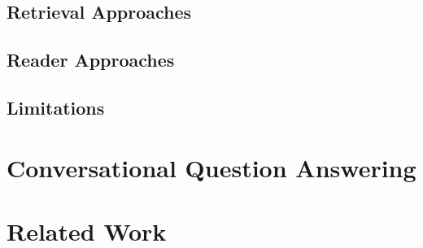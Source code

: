 \subsection{Retrieval Approaches}
\label{subsec:qa_retrieval}

\subsection{Reader Approaches}
\label{subsec:qa_user_interaction}


\subsection{Limitations}
\label{subsec:qa_limitations}

\section{Conversational Question Answering}
\label{sec:cqa}

\section{Related Work}
\label{sec:related_work}